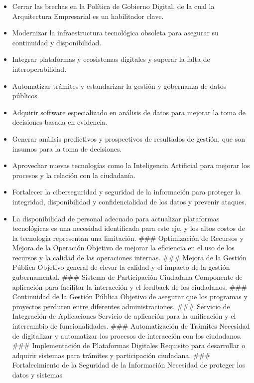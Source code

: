 \documentclass[
	a4paper, %
	12pt, %
]{include/CSSullivanBusinessReport}
\def\tightlist{}
\begin{document}
\begin{itemize}
\tightlist
\item
  Cerrar las brechas en la Política de Gobierno Digital, de la cual la
  Arquitectura Empresarial es un habilitador clave.
\item
  Modernizar la infraestructura tecnológica obsoleta para asegurar su
  continuidad y disponibilidad.
\item
  Integrar plataformas y ecosistemas digitales y superar la falta de
  interoperabilidad.
\item
  Automatizar trámites y estandarizar la gestión y gobernanza de datos
  públicos.
\item
  Adquirir software especializado en análisis de datos para mejorar la
  toma de decisiones basada en evidencia.
\item
  Generar análisis predictivos y prospectivos de resultados de gestión,
  que son insumos para la toma de decisiones.
\item
  Aprovechar nuevas tecnologías como la Inteligencia Artificial para
  mejorar los procesos y la relación con la ciudadanía.
\item
  Fortalecer la ciberseguridad y seguridad de la información para
  proteger la integridad, disponibilidad y confidencialidad de los datos
  y prevenir ataques.
\item
  La disponibilidad de personal adecuado para actualizar plataformas
  tecnológicas es una necesidad identificada para este eje, y los altos
  costos de la tecnología representan una limitación. \#\#\#
  Optimización de Recursos y Mejora de la Operación Objetivo de mejorar
  la eficiencia en el uso de los recursos y la calidad de las
  operaciones internas. \#\#\# Mejora de la Gestión Pública Objetivo
  general de elevar la calidad y el impacto de la gestión gubernamental.
  \#\#\# Sistema de Participación Ciudadana Componente de aplicación
  para facilitar la interacción y el feedback de los ciudadanos. \#\#\#
  Continuidad de la Gestión Pública Objetivo de asegurar que los
  programas y proyectos perduren entre diferentes administraciones.
  \#\#\# Servicio de Integración de Aplicaciones Servicio de aplicación
  para la unificación y el intercambio de funcionalidades. \#\#\#
  Automatización de Trámites Necesidad de digitalizar y automatizar los
  procesos de interacción con los ciudadanos. \#\#\# Implementación de
  Plataformas Digitales Requisito para desarrollar o adquirir sistemas
  para trámites y participación ciudadana. \#\#\# Fortalecimiento de la
  Seguridad de la Información Necesidad de proteger los datos y sistemas

\end{itemize}
\end{document}
